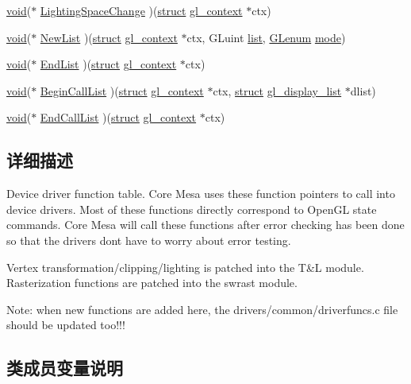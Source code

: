 \begin{Indent}
\begin{DoxyCompactItemize}
\item 
\hyperlink{interfacevoid}{void}($\ast$ \hyperlink{structdd__function__table_aac5505917d73e62a3a365ced64981083}{Lighting\+Space\+Change} )(\hyperlink{interfacestruct}{struct} \hyperlink{structgl__context}{gl\+\_\+context} $\ast$ctx)
\item 
\hyperlink{interfacevoid}{void}($\ast$ \hyperlink{structdd__function__table_a4fb10c66063fa5b3c6b98d4c9fc38b39}{New\+List} )(\hyperlink{interfacestruct}{struct} \hyperlink{structgl__context}{gl\+\_\+context} $\ast$ctx, G\+Luint \hyperlink{classlist}{list}, \hyperlink{interfacevoid}{G\+Lenum} \hyperlink{interfacevoid}{mode})
\item 
\hyperlink{interfacevoid}{void}($\ast$ \hyperlink{structdd__function__table_ab5c8edfc3ba9a6b3ff4dcfee53e4a2b9}{End\+List} )(\hyperlink{interfacestruct}{struct} \hyperlink{structgl__context}{gl\+\_\+context} $\ast$ctx)
\item 
\hyperlink{interfacevoid}{void}($\ast$ \hyperlink{structdd__function__table_aefd7eee06c86ee7548b6648fb970369e}{Begin\+Call\+List} )(\hyperlink{interfacestruct}{struct} \hyperlink{structgl__context}{gl\+\_\+context} $\ast$ctx, \hyperlink{interfacestruct}{struct} \hyperlink{structgl__display__list}{gl\+\_\+display\+\_\+list} $\ast$dlist)
\item 
\hyperlink{interfacevoid}{void}($\ast$ \hyperlink{structdd__function__table_aa3a6bf7d319a558b88733fb71e7b4f6e}{End\+Call\+List} )(\hyperlink{interfacestruct}{struct} \hyperlink{structgl__context}{gl\+\_\+context} $\ast$ctx)
\end{DoxyCompactItemize}
\end{Indent}


\subsection{详细描述}
Device driver function table. Core Mesa uses these function pointers to call into device drivers. Most of these functions directly correspond to Open\+GL state commands. Core Mesa will call these functions after error checking has been done so that the drivers don\textquotesingle{}t have to worry about error testing.

Vertex transformation/clipping/lighting is patched into the T\&L module. Rasterization functions are patched into the swrast module.

Note\+: when new functions are added here, the drivers/common/driverfuncs.\+c file should be updated too!!! 

\subsection{类成员变量说明}
\mbox{\label{structdd__function__table_aec6b2d3bc372cc7796bf30ae6eb297e4}} 
